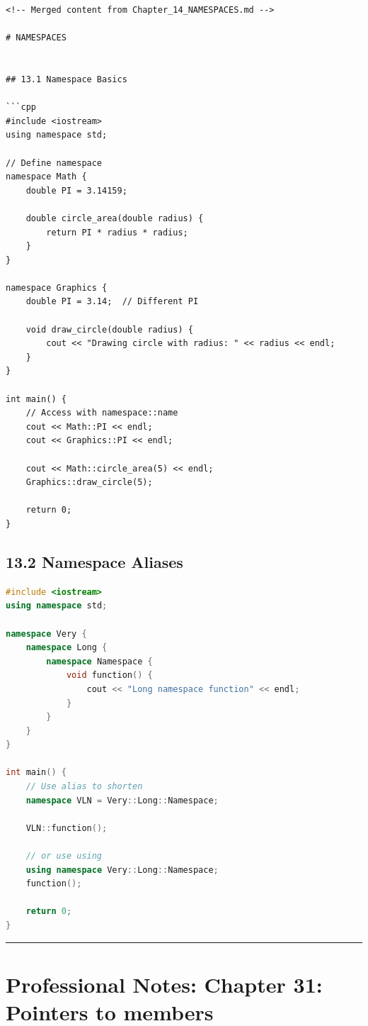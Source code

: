 \begin{lstlisting}
<!-- Merged content from Chapter_14_NAMESPACES.md -->

# NAMESPACES


## 13.1 Namespace Basics

```cpp
#include <iostream>
using namespace std;

// Define namespace
namespace Math {
    double PI = 3.14159;
    
    double circle_area(double radius) {
        return PI * radius * radius;
    }
}

namespace Graphics {
    double PI = 3.14;  // Different PI
    
    void draw_circle(double radius) {
        cout << "Drawing circle with radius: " << radius << endl;
    }
}

int main() {
    // Access with namespace::name
    cout << Math::PI << endl;
    cout << Graphics::PI << endl;
    
    cout << Math::circle_area(5) << endl;
    Graphics::draw_circle(5);
    
    return 0;
}
\end{lstlisting}

\hypertarget{namespace-aliases}{%
\section{13.2 Namespace Aliases}\label{namespace-aliases}}

\begin{lstlisting}[language={C++}]
#include <iostream>
using namespace std;

namespace Very {
    namespace Long {
        namespace Namespace {
            void function() {
                cout << "Long namespace function" << endl;
            }
        }
    }
}

int main() {
    // Use alias to shorten
    namespace VLN = Very::Long::Namespace;
    
    VLN::function();
    
    // or use using
    using namespace Very::Long::Namespace;
    function();
    
    return 0;
}
\end{lstlisting}

\begin{center}\rule{0.5\linewidth}{0.5pt}\end{center}

\hypertarget{professional-notes-chapter-31-pointers-to-members}{%
\chapter{Professional Notes: Chapter 31: Pointers to
members}\label{professional-notes-chapter-31-pointers-to-members}}

